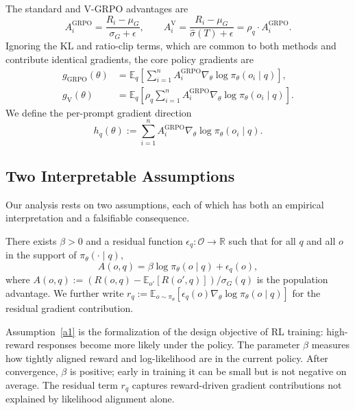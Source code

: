 \documentclass[10pt]{article}
\begin{document}
The standard and V-GRPO advantages are
\begin{equation}
A_i^{\text{GRPO}} = \frac{R_i - \mu_G}{\sigma_G + \epsilon},
\qquad
A_i^{\text{V}} = \frac{R_i - \mu_G}{\hat\sigma(T) + \epsilon} = \rho_q \cdot A_i^{\text{GRPO}}.
\end{equation}
Ignoring the KL and ratio-clip terms, which are common to both methods and
contribute identical gradients, the core policy gradients are
\begin{align}
g_{\text{GRPO}}(\theta) &= \mathbb{E}_q\!\left[\sum_{i=1}^n A_i^{\text{GRPO}}
   \nabla_\theta \log\pi_\theta(o_i \mid q)\right], \\
g_{\text{V}}(\theta) &= \mathbb{E}_q\!\left[\rho_q \sum_{i=1}^n A_i^{\text{GRPO}}
   \nabla_\theta \log\pi_\theta(o_i \mid q)\right].
\end{align}
We define the per-prompt gradient direction
\begin{equation}
h_q(\theta) := \sum_{i=1}^n A_i^{\text{GRPO}} \nabla_\theta \log\pi_\theta(o_i \mid q).
\end{equation}

\subsection{Two Interpretable Assumptions}
\label{sec:theory:assumptions}

Our analysis rests on two assumptions, each of which has both an empirical
interpretation and a falsifiable consequence.

\begin{assumption}
\label{a1}
There exists $\beta > 0$ and a residual function $\epsilon_q : \mathcal{O} \to \mathbb{R}$
such that for all $q$ and all $o$ in the support of $\pi_\theta(\cdot\mid q)$,
\begin{equation}
A(o, q) = \beta \log\pi_\theta(o \mid q) + \epsilon_q(o),
\label{eq:a1}
\end{equation}
where $A(o, q) := (R(o, q) - \mathbb{E}_{o'}[R(o',q)])/\sigma_G(q)$ is the
population advantage. We further write
$r_q := \mathbb{E}_{o\sim\pi_\theta}[\epsilon_q(o) \nabla_\theta \log\pi_\theta(o \mid q)]$
for the residual gradient contribution.
\end{assumption}

\begin{remark}
Assumption~\ref{a1} is the formalization of the design objective of RL
training: high-reward responses become more likely under the policy. The
parameter $\beta$ measures how tightly aligned reward and log-likelihood are
in the current policy. After convergence, $\beta$ is positive; early in
training it can be small but is not negative on average. The residual term
$r_q$ captures reward-driven gradient contributions not explained by
likelihood alignment alone.
\end{remark}
\end{document}
